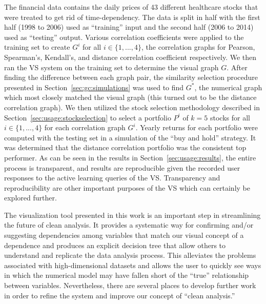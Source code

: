 The financial data contains the daily prices of 43 different healthcare 
stocks that were treated to get rid of time-dependency. The data is split in 
half with the first half (1998 to 2006) used as ``training'' input and the 
second half (2006 to 2014) used as ``testing'' output. Various correlation 
coefficients were applied to the training set to create $G^i$ for all $i \in 
\{1,...,4\}$, the correlation graphs for Pearson, Spearman's, Kendall's, and 
distance correlation coefficient respectively. We then ran the VS system on the 
training set to determine the visual graph $G$. After finding the difference 
between each graph pair, the similarity selection procedure presented in 
Section~\ref{sec:gc:simulations} was used to find $G^*$, the numerical 
graph which most closely matched the visual graph (this turned out to be the 
distance correlation graph). We then utilized the stock selection methodology 
described in Section~\ref{sec:usage:stockselection} to select a portfolio $P^i$ 
of $k = 5$ stocks for all $i \in \{1,...,4\}$ for each correlation graph $G^i$. 
Yearly returns for each portfolio were computed with the testing set in a 
simulation of the ``buy and hold'' strategy. It was determined that the 
distance correlation portfolio was the consistent top performer. As can be seen 
in the results in Section~\ref{sec:usage:results}, the entire process is  
transparent, and results are reproducible given the recorded user responses 
to the active learning queries of the VS. Transparency and reproducibility are 
other important purposes of the VS which can certainly be explored further.

The visualization tool presented in this work is an important step in 
streamlining the future of clean analysis. It provides a systematic way for 
confirming and/or suggesting dependencies among variables that match our visual 
concept of a dependence and produces an explicit decision tree that allow 
others to understand and replicate the data analysis process. This alleviates 
the problems associated with high-dimensional datasets and allows the 
user to quickly see ways in which the numerical model may have fallen short of 
the ``true'' relationship between variables. Nevertheless, there are several 
places to develop further work in order to refine the system and improve our 
concept of ``clean analysis.''